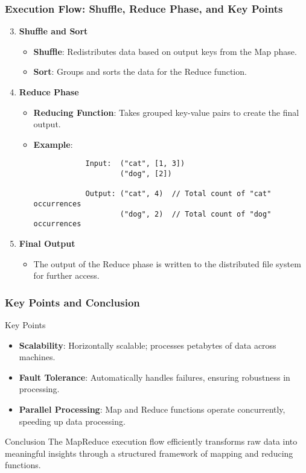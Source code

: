 \documentclass[aspectratio=169]{beamer}
\begin{document}
\begin{frame}[fragile]
    \frametitle{Execution Flow: Shuffle, Reduce Phase, and Key Points}
    \begin{enumerate}
        \setcounter{enumi}{2}
        \item \textbf{Shuffle and Sort}
        \begin{itemize}
            \item \textbf{Shuffle}: Redistributes data based on output keys from the Map phase.
            \item \textbf{Sort}: Groups and sorts the data for the Reduce function.
        \end{itemize}

        \item \textbf{Reduce Phase}
        \begin{itemize}
            \item \textbf{Reducing Function}: Takes grouped key-value pairs to create the final output.
            \item \textbf{Example}:
            \begin{lstlisting}
            Input:  ("cat", [1, 3])  
                    ("dog", [2])  

            Output: ("cat", 4)  // Total count of "cat" occurrences
                    ("dog", 2)  // Total count of "dog" occurrences
            \end{lstlisting}
        \end{itemize}

        \item \textbf{Final Output}
        \begin{itemize}
            \item The output of the Reduce phase is written to the distributed file system for further access.
        \end{itemize}
    \end{enumerate}
\end{frame}

\begin{frame}[fragile]
    \frametitle{Key Points and Conclusion}
    \begin{block}{Key Points}
        \begin{itemize}
            \item \textbf{Scalability}: Horizontally scalable; processes petabytes of data across machines.
            \item \textbf{Fault Tolerance}: Automatically handles failures, ensuring robustness in processing.
            \item \textbf{Parallel Processing}: Map and Reduce functions operate concurrently, speeding up data processing.
        \end{itemize}
    \end{block}

    \begin{block}{Conclusion}
        The MapReduce execution flow efficiently transforms raw data into meaningful insights through a structured framework of mapping and reducing functions.
    \end{block}
\end{frame}
\end{document}

